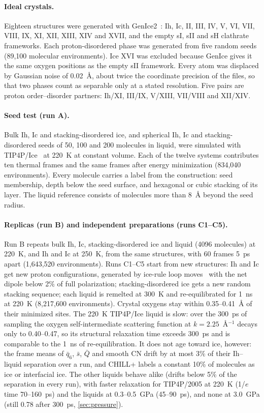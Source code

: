 \documentclass[11pt,a4paper]{article}
\begin{document}
\paragraph{Ideal crystals.} Eighteen structures were generated with
GenIce2~\cite{Matsumoto2018,Matsumoto2024}: Ih, Ic, II, III, IV, V, VI, VII,
VIII, IX, XI, XII, XIII, XIV and XVII, and the empty sI, sII and sH clathrate
frameworks. Each proton-disordered phase was generated from five random
seeds (89,100 molecular environments). Ice XVI was excluded because GenIce
gives it the same oxygen positions as the empty sII framework. Every atom was
displaced by Gaussian noise of 0.02~\AA, about twice the coordinate precision
of the files, so that two phases count as separable only at a stated
resolution. Five pairs are proton order--disorder partners: Ih/XI, III/IX,
V/XIII, VII/VIII and XII/XIV.

\paragraph{Seed test (run A).} Bulk Ih, Ic and stacking-disordered ice, and
spherical Ih, Ic and stacking-disordered seeds of 50, 100 and 200 molecules
in liquid, were simulated with TIP4P/Ice~\cite{Abascal2005a} at 220~K at
constant volume. Each of the twelve systems contributes ten thermal frames
and the same frames after energy minimization (834,040 environments). Every
molecule carries a label from the construction: seed membership, depth below
the seed surface, and hexagonal or cubic stacking of its layer. The liquid
reference consists of molecules more than 8~\AA{} beyond the seed radius.

\paragraph{Replicas (run B) and independent preparations (runs C1--C5).} Run
B repeats bulk Ih, Ic, stacking-disordered ice and liquid (4096 molecules) at
220~K, and Ih and Ic at 250~K, from the same structures, with 60 frames 5~ps
apart (1,643,520 environments). Runs C1--C5 start from new structures: Ih and
Ic get new proton configurations, generated by ice-rule loop
moves~\cite{Rick2003,Buch1998} with the net dipole below 2\% of full
polarization; stacking-disordered ice gets a new random stacking sequence;
each liquid is remelted at 300~K and re-equilibrated for 1~ns at 220~K
(8,217,600 environments). Crystal oxygens stay within 0.35--0.41~\AA{} of
their minimized sites. The 220~K TIP4P/Ice liquid is slow: over the 300~ps of
sampling the oxygen self-intermediate scattering function at
$k=2.25$~\AA$^{-1}$ decays only to 0.40--0.47, so its structural relaxation
time exceeds 300~ps and is comparable to the 1~ns of re-equilibration. It
does not age toward ice, however: the frame means of $\bar q_6$, $\bar s$,
$\bar Q$ and smooth CN drift by at most 3\% of their Ih--liquid separation
over a run, and CHILL+ labels a constant 10\% of molecules as ice or
interfacial ice. The other liquids behave alike (drifts below 5\% of the
separation in every run), with faster relaxation for TIP4P/2005 at 220~K
(1/$e$ time 70--160~ps) and the liquids at 0.3--0.5~GPa (45--90~ps), and none
at 3.0~GPa (still 0.78 after 300~ps, \cref{sec:pressure}).
\end{document}
